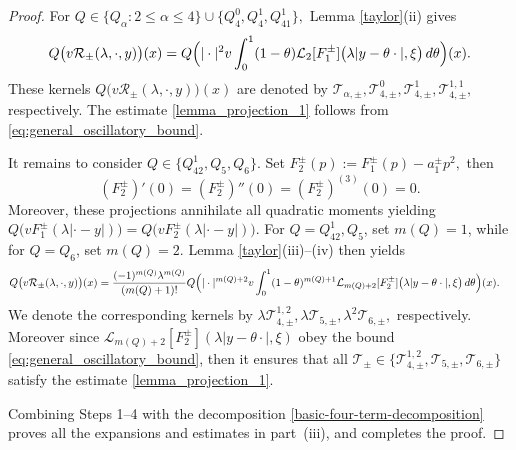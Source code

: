 \documentclass[reqno]{amsart}
\numberwithin{equation}{section}
\begin{document}
\begin{proof}
	For
	$
	Q
	\in
	\{Q_\alpha:2\leq\alpha\leq4\}
	\cup
	\{Q_4^0,Q_4^1,Q_{41}^1\},
	$
	Lemma \ref{taylor}(ii) gives
	\[
		Q
		\bigl(
		v\mathcal{R}_\pm(\lambda,\cdot,y)
		\bigr)(x)
	=
		Q
		\Bigl(
		|\cdot|^2v
		\int_0^1
		(1-\theta)
		\mathcal{L}_2[F_1^\pm]
		\bigl(
		\lambda|y-\theta\cdot|,
		\xi
		\bigr)
		\,d\theta
		\Bigr)(x).
	\]
	These kernels $Q
	\bigl(
	v\mathcal{R}_\pm(\lambda,\cdot,y)
	\bigr)(x)$  are denoted by
	$
	\mathcal{T}_{\alpha,\pm},
	\mathcal{T}_{4,\pm}^0,
	\mathcal{T}_{4,\pm}^1,
	\mathcal{T}_{4,\pm}^{1,1},
	$
	respectively. The estimate \eqref{lemma_projection_1} follows
	 from \eqref{eq:general_oscillatory_bound}.
	
	It remains to consider
	$
	Q\in\{Q_{42}^1,Q_5,Q_6\}.
	$
	Set
	$
	F_2^\pm(p)
	:=
	F_1^\pm(p)-a_1^\pm p^2,
	$ then $$
	(F_2^\pm)'(0)
	=
	(F_2^\pm)''(0)
	=
	(F_2^\pm)^{(3)}(0)
	=
	0.
	$$
	Moreover,  these projections annihilate all quadratic moments yielding 
	$
	Q
	\bigl(
	vF_1^\pm(\lambda|\cdot-y|)
	\bigr)
	=
	Q
	\bigl(
	vF_2^\pm(\lambda|\cdot-y|)
	\bigr).
	$
	For $Q=Q_{42}^1,Q_5$, set $m(Q)=1$, while for $Q=Q_6$, set
	$m(Q)=2$. Lemma \ref{taylor}(iii)--(iv) then yields
	\begin{align*}
		&
		Q
		\bigl(
		v\mathcal{R}_\pm(\lambda,\cdot,y)
		\bigr)(x)
	=
		\frac{(-1)^{m(Q)}\lambda^{m(Q)}}{(m(Q)+1)!}
		Q
		\Bigl(
		|\cdot|^{m(Q)+2}v
		\int_0^1
		(1-\theta)^{m(Q)+1}
		\mathcal{L}_{m(Q)+2}[F_2^\pm]
		\bigl(
		\lambda|y-\theta\cdot|,
		\xi
		\bigr)
		\,d\theta
		\Bigr)(x).
	\end{align*}
	We denote the corresponding kernels by
	$
	\lambda\mathcal{T}_{4,\pm}^{1,2},
	\lambda\mathcal{T}_{5,\pm},
	\lambda^2\mathcal{T}_{6,\pm},
	$
	respectively. Moreover since   $\mathcal{L}_{m(Q)+2}[F_2^\pm](\lambda|y-\theta\cdot|,\xi)$ obey the  bound \eqref{eq:general_oscillatory_bound}, then it ensures that 
	all $\mathcal{T}_{\pm} \in \{ \mathcal{T}_{4,\pm}^{1,2},\mathcal{T}_{5,\pm}, \mathcal{T}_{6,\pm} \}$
	satisfy the  estimate \eqref{lemma_projection_1}.
	
	
	
	
	
	
	
	Combining Steps 1--4 with the decomposition
	\eqref{basic-four-term-decomposition} proves all the expansions and
	estimates in part~{\rm (iii)}, and completes the proof.
\end{proof}
\end{document}
